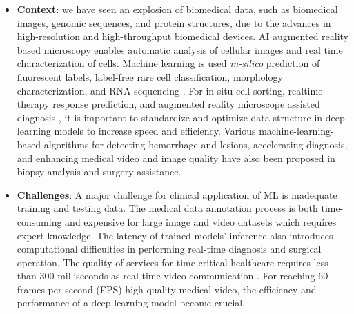    \begin{itemize}
        \item \textbf{Context}: we have seen an explosion of biomedical data, such as biomedical images, genomic sequences, and protein structures, due to the advances in high-resolution and high-throughput biomedical devices. AI augmented reality based microscopy \cite{Chen2019-ze} enables automatic analysis of cellular images and real time characterization of cells. Machine learning is used \textit{in-silico} prediction of fluorescent labels, label-free rare cell classification, morphology characterization, and RNA sequencing \cite{Christiansen2018-eu,Wang2020-lr,Siu2020-kd,Tang2018-mj,Li2020-cx}. For in-situ cell sorting, realtime therapy response prediction, and augmented reality microscope assisted diagnosis \cite{Chen2019-ze,Nitta2018-bc,Sakellaropoulos2019-tq}, it is important to standardize and optimize data structure in deep learning models to increase speed and efficiency. Various machine-learning-based algorithms for detecting hemorrhage and lesions, accelerating diagnosis, and enhancing medical video and image quality have also been proposed in biopsy analysis and surgery assistance.
        
        \item \textbf{Challenges}: A major challenge for clinical application of ML is inadequate training and testing data. The medical data annotation process is both time-consuming and expensive for large image and video datasets which requires expert knowledge. The latency of trained models’ inference also introduces computational difficulties in performing real-time diagnosis and surgical operation. The quality of services for time-critical healthcare requires less than 300 milliseconds as real-time video communication \cite{Shukla2019-bz}. For reaching 60 frames per second (FPS) high quality medical video, the efficiency and performance of a deep learning model become crucial.
        

\end{itemize}
